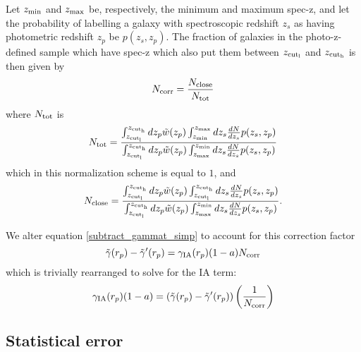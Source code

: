 \documentclass[onecolumn,amsmath,aps,fleqn, superscriptaddress]{revtex4}
\begin{document}
Let $z_{\rm min}$ and $z_{\rm max}$ be, respectively, the minimum and maximum spec-z, and let the probability of labelling a galaxy with spectroscopic redshift $z_s$ as having photometric redshift $z_p$ be $p(z_s, z_p)$. The fraction of galaxies in the photo-z-defined sample which have spec-z which also put them between $z_{\rm cut_l}$ and $z_{\rm cut_h}$ is then given by
\begin{equation}
N_{\rm corr} = \frac{N_{\rm close}}{N_{\rm tot}}
\label{Ncorr}
\end{equation}
where $N_{\rm tot}$ is
\begin{equation}
N_{\rm tot} = \frac{\int_{z_{\rm cut_l}}^{z_{\rm cut_h}} dz_p  \tilde{w}(z_p) \int_{z_{\rm min}}^{z_{\rm max}} dz_s\frac{dN}{dz_s} p(z_s, z_p)}{\int_{z_{\rm cut_l}}^{z_{\rm cut_h}} d z_{p} \tilde{w}(z_p) \int_{z_{\rm max}}^{z_{\rm min}} dz_s\frac{dN}{dz_s} p(z_s, z_p)}
\label{tot}
\end{equation}
which in this normalization scheme is equal to $1$, and 
\begin{equation}
N_{\rm close} = \frac{\int_{z_{\rm cut_l}}^{z_{\rm cut_h}} dz_p \tilde{w}(z_p) \int_{z_{\rm cut_l}}^{z_{\rm cut_h}} dz_s\frac{dN}{dz_s} p(z_s, z_p)}{\int_{z_{\rm cut_l}}^{z_{\rm cut_h}} d z_{p} \tilde{w}(z_p)\int_{z_{\rm max}}^{z_{\rm min}} dz_s\frac{dN}{dz_s} p(z_s, z_p)}.
\label{close}
\end{equation}

We alter equation \ref{subtract_gammat_simp} to account for this correction factor
\begin{equation}
\tilde{\gamma}(r_p) - \tilde{\gamma}^\prime(r_p) = \gamma_{\rm IA}(r_p)(1-a) N_{\rm corr}
\label{subtract_gammat_fac}
\end{equation}
which is trivially rearranged to solve for the IA term:
\begin{equation}
\gamma_{\rm IA}(r_p)(1-a) = \left(\tilde{\gamma}(r_p) - \tilde{\gamma}^\prime(r_p)\right)\left(\frac{1}{N_{\rm corr}}\right)
\label{IAsol}
\end{equation}

\subsection*{Statistical error}
\end{document}

